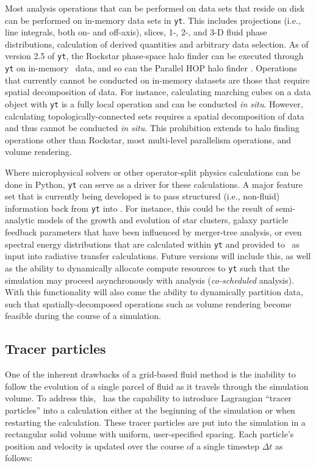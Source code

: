Most analysis operations that can be performed on data sets that reside on
disk can be performed on in-memory data sets in \texttt{yt}.  This includes
projections (i.e., line integrals, both on- and off-axis), slices, 1-, 2-, and
3-D fluid phase distributions, calculation of derived quantities and arbitrary
data selection.  As of version 2.5 of \texttt{yt},  the Rockstar phase-space
halo finder \citep{2013ApJ...762..109B} can be executed through \texttt{yt} on
in-memory \enzo\ data, and so can the Parallel HOP halo finder
\citep{1998ApJ...498..137E, 2010ApJS..191...43S}.  Operations that currently cannot be conducted on
in-memory datasets are those that require spatial decomposition of
data.  For 
instance, calculating marching cubes on a data object with \texttt{yt} is a
fully local operation and can be conducted \textit{in situ}.  However,
calculating topologically-connected sets requires a spatial decomposition of
data and thus cannot be conducted \textit{in situ}.  This prohibition extends
to halo finding operations other than Rockstar, most multi-level
parallelism operations, and volume rendering.

Where microphysical solvers or other operator-split physics calculations can be
done in Python, \texttt{yt} can serve as a driver for these calculations.  A
major feature set that is currently being developed is to pass structured
(i.e., non-fluid) information back from \texttt{yt} into \enzo.  For instance,
this could be the result of semi-analytic models of the growth and evolution of
star clusters, galaxy particle feedback parameters that have been influenced by
merger-tree analysis, or even spectral energy distributions that are calculated
within \texttt{yt} and provided to \enzo\ as input into radiative transfer
calculations.  Future versions will include this, as well as the ability to
dynamically allocate compute resources to \texttt{yt} such that the simulation
may proceed asynchronously with analysis (\textit{co-scheduled} analysis).
With this functionality will also come the ability to dynamically partition
data, such that spatially-decomposed operations such as volume rendering become
feasible during the course of a simulation.

\subsection{Tracer particles}

One of the inherent drawbacks of a grid-based fluid method is the
inability to follow the evolution of a single parcel of fluid as it
travels through the simulation volume.  To address this, \enzo\ has the
capability to introduce Lagrangian ``tracer particles'' into a
calculation either at the beginning of the simulation or when
restarting the calculation.  These tracer particles are put into the
simulation in a rectangular solid volume with uniform, user-specified
spacing.  Each particle's position and velocity is updated over the
course of a single timestep $\Delta t$ as follows:


